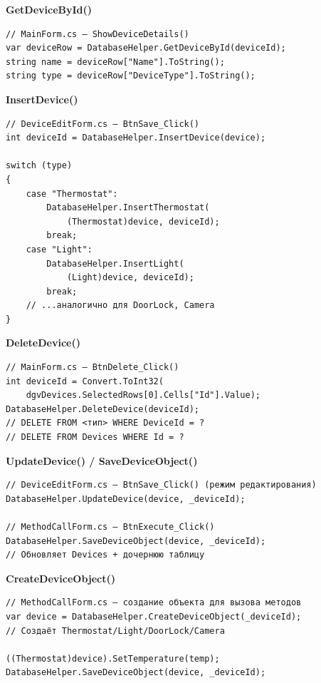 \documentclass[oneside,a4paper,14pt]{extarticle}
\begin{document}
\textbf{GetDeviceById()}

\begin{verbatim}
// MainForm.cs — ShowDeviceDetails()
var deviceRow = DatabaseHelper.GetDeviceById(deviceId);
string name = deviceRow["Name"].ToString();
string type = deviceRow["DeviceType"].ToString();
\end{verbatim}

\textbf{InsertDevice()}

\begin{verbatim}
// DeviceEditForm.cs — BtnSave_Click()
int deviceId = DatabaseHelper.InsertDevice(device);

switch (type)
{
    case "Thermostat":
        DatabaseHelper.InsertThermostat(
            (Thermostat)device, deviceId);
        break;
    case "Light":
        DatabaseHelper.InsertLight(
            (Light)device, deviceId);
        break;
    // ...аналогично для DoorLock, Camera
}
\end{verbatim}

\textbf{DeleteDevice()}

\begin{verbatim}
// MainForm.cs — BtnDelete_Click()
int deviceId = Convert.ToInt32(
    dgvDevices.SelectedRows[0].Cells["Id"].Value);
DatabaseHelper.DeleteDevice(deviceId);
// DELETE FROM <тип> WHERE DeviceId = ?
// DELETE FROM Devices WHERE Id = ?
\end{verbatim}

\textbf{UpdateDevice() / SaveDeviceObject()}

\begin{verbatim}
// DeviceEditForm.cs — BtnSave_Click() (режим редактирования)
DatabaseHelper.UpdateDevice(device, _deviceId);

// MethodCallForm.cs — BtnExecute_Click()
DatabaseHelper.SaveDeviceObject(device, _deviceId);
// Обновляет Devices + дочернюю таблицу
\end{verbatim}

\textbf{CreateDeviceObject()}

\begin{verbatim}
// MethodCallForm.cs — создание объекта для вызова методов
var device = DatabaseHelper.CreateDeviceObject(_deviceId);
// Создаёт Thermostat/Light/DoorLock/Camera

((Thermostat)device).SetTemperature(temp);
DatabaseHelper.SaveDeviceObject(device, _deviceId);
\end{verbatim}
\end{document}
